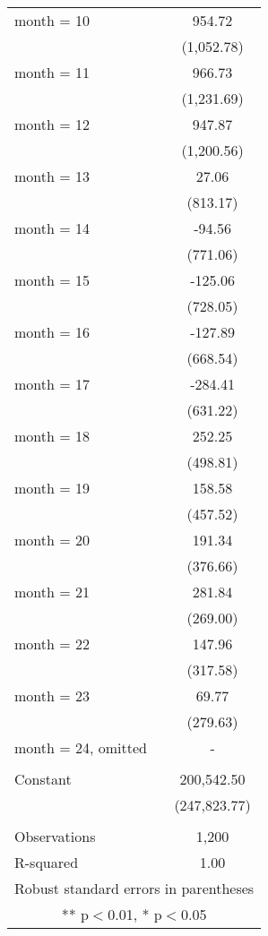 \begin{tabular}{lc}
month = 10 & 954.72 \\
 & (1,052.78) \\
month = 11 & 966.73 \\
 & (1,231.69) \\
month = 12 & 947.87 \\
 & (1,200.56) \\
month = 13 & 27.06 \\
 & (813.17) \\
month = 14 & -94.56 \\
 & (771.06) \\
month = 15 & -125.06 \\
 & (728.05) \\
month = 16 & -127.89 \\
 & (668.54) \\
month = 17 & -284.41 \\
 & (631.22) \\
month = 18 & 252.25 \\
 & (498.81) \\
month = 19 & 158.58 \\
 & (457.52) \\
month = 20 & 191.34 \\
 & (376.66) \\
month = 21 & 281.84 \\
 & (269.00) \\
month = 22 & 147.96 \\
 & (317.58) \\
month = 23 & 69.77 \\
 & (279.63) \\
month = 24, omitted & - \\
 &  \\
Constant & 200,542.50 \\
 & (247,823.77) \\
 &  \\
Observations & 1,200 \\
 R-squared & 1.00 \\ \hline
\multicolumn{2}{c}{ Robust standard errors in parentheses} \\
\multicolumn{2}{c}{ ** p$<$0.01, * p$<$0.05} \\
\end{tabular}
